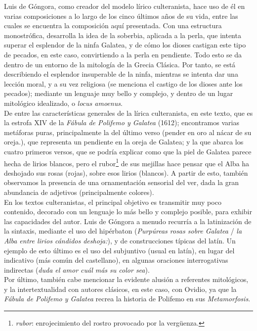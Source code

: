 \documentclass[12pt,a4paper]{article}
\begin{document}
Luis de Góngora, como creador del modelo lírico culteranista, hace uso de él en varias composiciones a lo largo de los cinco últimos años de su vida, entre las cuales se encuentra la composición aquí presentada. Con una estructura monostrófica, desarrolla la idea de la soberbia, aplicada a la perla, que intenta superar el esplendor de la ninfa Galatea, y de cómo los dioses castigan este tipo de pecados, en este caso, convirtiendo a la perla en pendiente. Todo esto se da dentro de un entorno de la mitología de la Grecia Clásica. Por tanto, se está describiendo el esplendor insuperable de la ninfa, mientras se intenta dar una lección moral, y a su vez religiosa (se menciona el castigo de los dioses ante los pecados); mediante un lenguaje muy bello y complejo, y dentro de un lugar mitológico idealizado, o \textit{locus amoenus}.\\

De entre las características generales de la lírica culteranista, en este texto, que es la estrofa XIV de la \textit{Fábula de Polifemo y Galatea} (1612); encontramos varias metáforas puras, principalmente la del último verso (pender en oro al nácar de su oreja.), que representa un pendiente en la oreja de Galatea; y la que abarca los cuatro primeros versos, que se podría explicar como que la piel de Galatea parece hecha de lirios blancos, pero el rubor\footnote{\textit{rubor}: enrojecimiento del rostro provocado por la vergüenza.} de sus mejillas hace pensar que el Alba ha deshojado sus rosas (rojas), sobre esos lirios (blancos). A partir de esto, también observamos la presencia de una ornamentación sensorial del ver, dada la gran abundancia de adjetivos (principalmente colores).\\

En los textos culteranistas, el principal objetivo es transmitir muy poco contenido, decorado con un lenguaje lo más bello y complejo posible, para exhibir las capacidades del autor. Luis de Góngora a menudo recurría a la latinización de la sintaxis, mediante el uso del hipérbaton (\textit{Purpúreas rosas sobre Galatea} / \textit{la Alba entre lirios cándidos deshoja:}), y de construcciones típicas del latín. Un ejemplo de esto último es el uso del subjuntivo (usual en latín), en lugar del indicativo (más común del castellano), en algunas oraciones interrogativas indirectas (\textit{duda el amor cuál más su color sea}).\\

Por último, también cabe mencionar la evidente alusión a referentes mitológicos, y la intertextualidad con autores clásicos, en este caso, con Ovidio, ya que la \textit{Fábula de Polifemo y Galatea} recrea la historia de Polifemo en sus \textit{Metamorfosis}.
\end{document}

